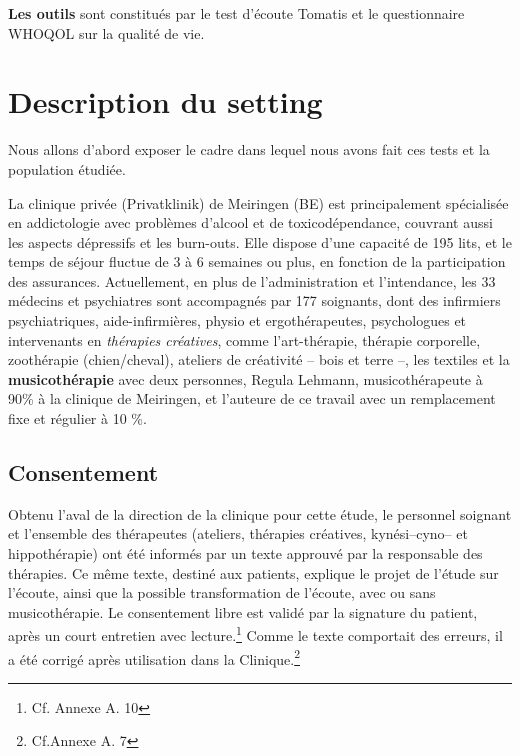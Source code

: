 \textbf{Les outils} sont constitués par  le test d'écoute Tomatis et le questionnaire WHOQOL sur la 
qualité de vie.


 
 
 \section{Description du setting}
 Nous allons
 d'abord exposer le cadre dans lequel nous avons fait ces tests et la
 population étudiée.
 
 La clinique privée (Privatklinik)
 de Meiringen (BE) est  principalement spécialisée en
 addictologie avec problèmes d'alcool et de toxicodépendance, couvrant aussi les aspects dépressifs
 et les
 burn-outs.
 Elle dispose d'une capacité de 195 lits, et le temps de séjour fluctue de 3 à 6 semaines ou plus, en
 fonction de la participation des assurances.
Actuellement, en plus de l'administration et l'intendance, les 33
 médecins et psychiatres sont
 accompagnés par 177
 soignants, dont des infirmiers psychiatriques, aide-infirmières, physio et
 ergothérapeutes,
 psychologues et intervenants en \textit{thérapies
 créatives}, comme l'art-thérapie, thérapie
 corporelle, zoothérapie (chien/cheval),  ateliers de créativité --
 bois et terre --,  les textiles et la\textbf{ musicothérapie} avec deux
 personnes, Regula Lehmann, musicothérapeute  à 90\%  à la clinique de Meiringen, et  l'auteure de ce 
 travail avec un remplacement fixe et régulier à 10 \%.
 
 \subsection{Consentement}
 Obtenu l'aval de la direction de la
 clinique pour cette étude,  le personnel soignant et l'ensemble des
 thérapeutes (ateliers, thérapies créatives, kynési--cyno--
 et hippothérapie) ont été  informés par un texte approuvé par la responsable des thérapies.
 Ce même texte, destiné aux
 patients, explique le projet de l'étude sur l'écoute, ainsi que la possible transformation de l'écoute,
 avec ou sans musicothérapie.
 Le consentement libre est validé par la signature du patient, après
 un court entretien avec lecture.\footnote{Cf. Annexe A. 10}
 Comme le texte comportait des erreurs, il a été 
 corrigé après utilisation dans la Clinique.\footnote{Cf.Annexe A. 7}
 
